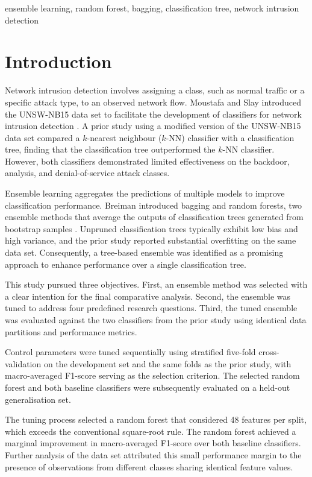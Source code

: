 \documentclass[conference]{IEEEtran}
\begin{document}
\begin{IEEEkeywords}
ensemble learning, random forest, bagging, classification tree, network intrusion detection
\end{IEEEkeywords}

\section{Introduction}

Network intrusion detection involves assigning a class, such as normal traffic or a specific attack type, to an observed network flow. Moustafa and Slay introduced the UNSW-NB15 data set to facilitate the development of classifiers for network intrusion detection \cite{moustafa}. A prior study using a modified version of the UNSW-NB15 data set compared a $k$-nearest neighbour ($k$-NN) classifier with a classification tree, finding that the classification tree outperformed the $k$-NN classifier. However, both classifiers demonstrated limited effectiveness on the backdoor, analysis, and denial-of-service attack classes.

Ensemble learning aggregates the predictions of multiple models to improve classification performance. Breiman introduced bagging and random forests, two ensemble methods that average the outputs of classification trees generated from bootstrap samples \cite{breiman1996,breiman2001}. Unpruned classification trees typically exhibit low bias and high variance, and the prior study reported substantial overfitting on the same data set. Consequently, a tree-based ensemble was identified as a promising approach to enhance performance over a single classification tree.

This study pursued three objectives. First, an ensemble method was selected with a clear intention for the final comparative analysis. Second, the ensemble was tuned to address four predefined research questions. Third, the tuned ensemble was evaluated against the two classifiers from the prior study using identical data partitions and performance metrics.

Control parameters were tuned sequentially using stratified five-fold cross-validation on the development set and the same folds as the prior study, with macro-averaged F1-score serving as the selection criterion. The selected random forest and both baseline classifiers were subsequently evaluated on a held-out generalisation set.

The tuning process selected a random forest that considered 48 features per split, which exceeds the conventional square-root rule. The random forest achieved a marginal improvement in macro-averaged F1-score over both baseline classifiers. Further analysis of the data set attributed this small performance margin to the presence of observations from different classes sharing identical feature values.
\end{document}
